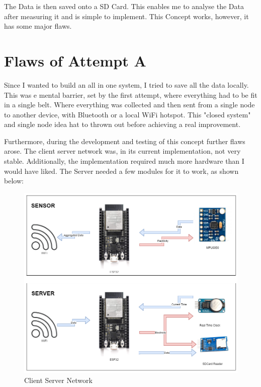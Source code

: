 The Data is then saved onto a SD Card. This enables me to analyse the Data after measuring it and is simple to implement. This Concept works, however, it has some major flaws. 

\section{Flaws of Attempt A}

Since I wanted to build an all in one system, I tried to save all the data locally. This was e mental barrier, set by the first attempt, where everything had to be fit in a single belt. Where everything was collected and then sent from a single node to another device, with Bluetooth or a local WiFi hotspot. This "closed system" and single node idea hat to thrown out before achieving a real improvement.

Furthermore, during the development and testing of this concept further flaws arose. The client server network was, in its current implementation, not very stable. Additionally, the implementation required much more hardware than I would have liked. 
The Server needed a few modules for it to work, as shown below:


\begin{figure}[ht]
  \begin{center}
\includegraphics[width=\linewidth]{images/CommunicationDiagrammExplenation.png}
  \end{center}
  \caption{Client Server Network}
  \label{fig:ClientServer}
\end{figure}

